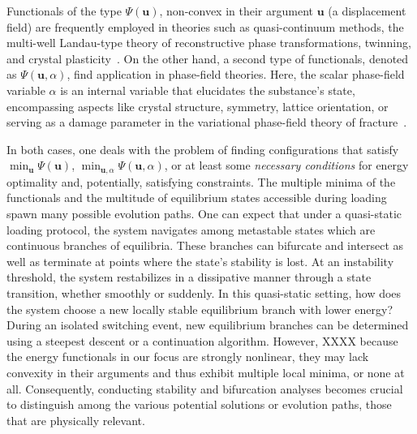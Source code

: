 Functionals of the type $\Psi(\mathbf u)$, non-convex in their argument  $\mathbf u$ (a displacement field) are frequently employed in theories such as quasi-continuum methods, the multi-well Landau-type theory of reconstructive phase transformations, twinning, and crystal plasticity~\cite{Tadmor1996-qi,Conti2004-yj,Clayton2011-xq,Baggio2019-rs,Baggio2023-qu}. On the other hand, a second type of functionals, denoted as $\Psi(\mathbf u, \alpha)$, find application in phase-field theories. Here, the scalar phase-field variable $\alpha$ is an internal variable that elucidates the substance's state, encompassing aspects like crystal structure, symmetry, lattice orientation, \cite{Finel2010-zw,Ruffini2015-pn,Javanbakht2016-dr} or serving as a damage parameter in the variational phase-field theory of fracture~\cite{francfort_marigo1998,Salman2021-mn}. 

In both cases, one deals with the problem of finding  configurations that satisfy $\min_{\boldsymbol{u}} \Psi(\boldsymbol{u})$, $\min_{\boldsymbol{u},\alpha} \Psi(\boldsymbol{u},\alpha)$, or at least some \emph{necessary conditions} for energy optimality and, potentially, satisfying constraints. 
The multiple minima of the functionals and the multitude of equilibrium states accessible during loading spawn many possible evolution paths. One can expect that under a quasi-static loading protocol, the system navigates among metastable states which are continuous branches of equilibria. These branches can bifurcate and intersect as well as terminate at points where the state’s stability is lost.
At an instability threshold, the system restabilizes in a dissipative manner through a state transition, whether smoothly or suddenly.
In this quasi-static setting, how does the system choose a new locally stable equilibrium branch with lower energy?
During an isolated switching event, new equilibrium branches can be determined using a steepest descent or a continuation algorithm. However, XXXX because the energy functionals in our focus are strongly nonlinear, they may lack convexity in their arguments and thus exhibit multiple local minima, or none at all. Consequently, conducting stability and bifurcation analyses becomes crucial to distinguish among the various potential solutions or evolution paths, those that are physically relevant.

